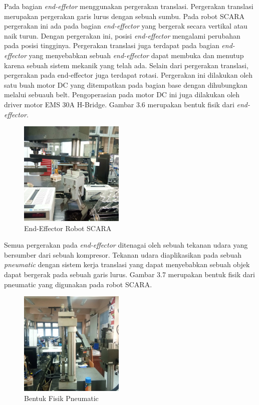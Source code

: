 Pada bagian \textit{end-effetor} menggunakan pergerakan translasi. Pergerakan translasi merupakan pergerakan garis lurus dengan sebuah sumbu. Pada robot SCARA pergerakan ini ada pada bagian \textit{end-effector} yang bergerak secara vertikal atau naik turun. Dengan pergerakan ini, posisi \textit{end-effector} mengalami perubahan pada posisi tingginya. Pergerakan translasi juga terdapat pada bagian \textit{end-effector} yang menyebabkan sebuah\textit{ end-effector} dapat membuka dan menutup karena sebuah sistem mekanik yang telah ada. Selain dari pergerakan translasi, pergerakan pada end-effector juga terdapat rotasi. Pergerakan ini dilakukan oleh satu buah motor DC yang ditempatkan pada bagian base dengan dihubungkan melalui sebuauh belt. Pengoperasian pada motor DC ini juga dilakukan oleh driver motor EMS 30A H-Bridge. Gambar 3.6 merupakan bentuk fisik dari \textit{end-effector}. 
\begin{figure}[H]
	\centering
	\includegraphics[width=5cm]{gambar/capitsementara.jpg}
	\caption{End-Effector Robot SCARA}
\end{figure}
Semua pergerakan pada \textit{end-effector} ditenagai oleh sebuah tekanan udara yang bersumber dari sebuah kompresor. Tekanan udara diaplikasikan pada sebuah \textit{pneumatic} dengan sistem kerja translasi yang dapat menyebabkan sebuah objek dapat bergerak pada sebuah garis lurus. Gambar 3.7 merupakan bentuk fisik dari pneumatic yang digunakan pada robot SCARA. 
\begin{figure}[H]
	\centering
	\includegraphics[width=5cm]{gambar/penuamticsementara.jpg}
	\caption{Bentuk Fisik Pneumatic}
\end{figure}

